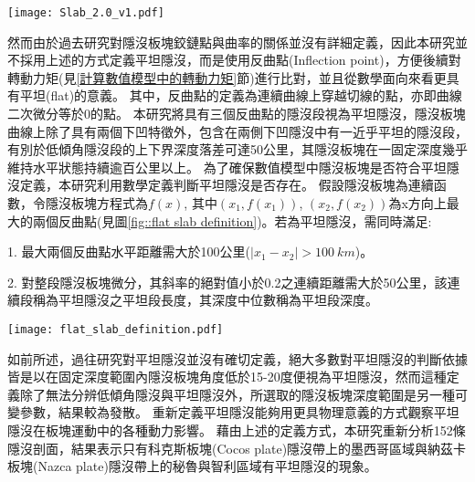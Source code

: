 \begin{figure*}[hbp]
    \centering
    \texttt{[image: Slab\_2.0\_v1.pdf]}
    \caption[slab 2.0 模型與四條參考剖面，改編自\citet{schellart2020control}]{slab 2.0 模型與四條參考剖面，改編自\citet{schellart2020control}。其中(a)為馬尼拉隱沒帶剖面，(b)為阿拉斯加隱沒帶剖面，(c)為加勒比板塊隱沒帶剖面，(d)為秘魯隱沒帶剖面。}
    \label{fig::slab profile}
\end{figure*}


然而由於過去研究對隱沒板塊鉸鏈點與曲率的關係並沒有詳細定義，因此本研究並不採用上述的方式定義平坦隱沒，而是使用反曲點(Inflection point)，方便後續對轉動力矩(見\ref{計算數值模型中的轉動力矩}節)進行比對，並且從數學面向來看更具有平坦(flat)的意義。
其中，反曲點的定義為連續曲線上穿越切線的點，亦即曲線二次微分等於0的點。
本研究將具有三個反曲點的隱沒段視為平坦隱沒，隱沒板塊曲線上除了具有兩個下凹特徵外，包含在兩側下凹隱沒中有一近乎平坦的隱沒段，有別於低傾角隱沒段的上下界深度落差可達50公里，其隱沒板塊在一固定深度幾乎維持水平狀態持續逾百公里以上。
為了確保數值模型中隱沒板塊是否符合平坦隱沒定義，本研究利用數學定義判斷平坦隱沒是否存在。
假設隱沒板塊為連續函數，令隱沒板塊方程式為$f(x)$, 其中$(x_{1},f(x_{1}))$, $(x_{2},f(x_{2}))$為x方向上最大的兩個反曲點(見圖\ref{fig::flat slab definition})。若為平坦隱沒，需同時滿足:

1. 最大兩個反曲點水平距離需大於100公里($\mid x_{1}-x_{2}\mid > 100 \ km$)。

2. 對整段隱沒板塊微分，其斜率的絕對值小於0.2之連續距離需大於50公里，該連續段稱為平坦隱沒之平坦段長度，其深度中位數稱為平坦段深度。

\begin{figure*}[ht!]
    \centering
    \texttt{[image: flat\_slab\_definition.pdf]}
    \caption[本研究中平坦隱沒的定義示意圖]{本研究中平坦隱沒的定義示意圖。綠色點表示隱沒板塊頂部上的反曲點，藍色點為隱沒板塊頂部上斜率絕對值小於0.2內最大連續範圍段的起點與終點。}
    \label{fig::flat slab definition}
\end{figure*}

如前所述，過往研究對平坦隱沒並沒有確切定義，絕大多數對平坦隱沒的判斷依據皆是以在固定深度範圍內隱沒板塊角度低於15-20度便視為平坦隱沒，然而這種定義除了無法分辨低傾角隱沒與平坦隱沒外，所選取的隱沒板塊深度範圍是另一種可變參數，結果較為發散。
重新定義平坦隱沒能夠用更具物理意義的方式觀察平坦隱沒在板塊運動中的各種動力影響。
藉由上述的定義方式，本研究重新分析152條隱沒剖面，結果表示只有科克斯板塊(Cocos plate)隱沒帶上的墨西哥區域與納茲卡板塊(Nazca plate)隱沒帶上的秘魯與智利區域有平坦隱沒的現象。

